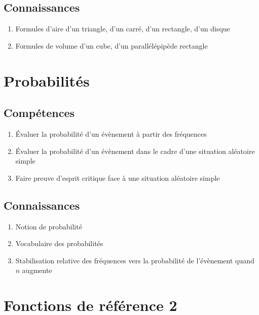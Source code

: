 \documentclass[12pt,a4paper]{article}
\begin{document}
	\subsection*{Connaissances}
	\begin{enumerate}
		\item Formules d'aire d'un triangle, d'un carré, d'un rectangle, d'un disque
		\item Formules de volume d'un cube, d'un parallélépipède rectangle
	\end{enumerate}	








\section{Probabilités}
\subsection*{Compétences}
\begin{enumerate}
	\item Évaluer la probabilité d'un évènement à partir des fréquences
	\item Évaluer la probabilité d'un évènement dans le cadre d'une situation aléatoire simple
	\item Faire preuve d'esprit critique face à une situation aléatoire simple
\end{enumerate}

\subsection*{Connaissances}
\begin{enumerate}
	\item Notion de probabilité
	\item Vocabulaire des probabilités
	\item Stabilisation relative des fréquences vers la probabilité de l'évènement quand $n$ augmente
\end{enumerate}




\section{Fonctions de référence 2}
\end{document}
